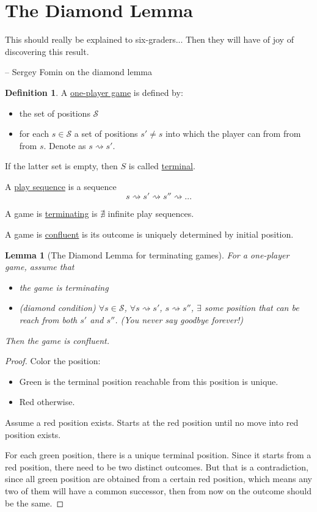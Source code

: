 \documentclass{report}
\newtheorem{lemma}{Lemma}[section]
\theoremstyle{definition}
\newtheorem{definition}{Definition}[section]
\theoremstyle{remark}
\numberwithin{equation}{section}
\begin{document}
\section{The Diamond Lemma}
\epigraph{This should really be explained to six-graders... Then they will have of joy of discovering this result.}{-- \textup{Sergey Fomin on the diamond lemma}}
\begin{definition}
    A \underline{one-player game} is defined by:
    \begin{itemize}
        \item the set of positions $\mathcal{S}$
        \item for each $s \in \mathcal{S}$ a set of positions $s' \neq s$ into which the player can from from from $s$. Denote as $s \rightsquigarrow s'$.
    \end{itemize}
    If the latter set is empty, then $S$ is called \underline{terminal}.

    A \underline{play sequence} is a sequence
    \[s \rightsquigarrow s' \rightsquigarrow s'' \rightsquigarrow \ldots\]

    A game is \underline{terminating} is $\nexists$ infinite play sequences.

    A game is \underline{confluent} is its outcome is uniquely determined by initial position.
\end{definition}

\begin{lemma}[The Diamond Lemma for terminating games]
    For a one-player game, assume that
    \begin{itemize}
        \item the game is terminating
        \item[$\diamond$](diamond condition) $\forall s \in \mathcal{S}$, $\forall s \rightsquigarrow s'$, $s \rightsquigarrow s''$, $\exists$ some position that can be reach from both $s'$ and $s''$. (You never say goodbye forever!)
    \end{itemize}
    Then the game is confluent.
\end{lemma}
\begin{proof}
    Color the position:
    \begin{itemize}
        \item[\textcolor{green}\textbullet] Green is the terminal position reachable from this position is unique.
        \item[\textcolor{red}\textbullet] Red otherwise.
    \end{itemize}
    Assume a red position exists. Starts at the red position until no move into red position exists. 

    For each green position, there is a unique terminal position. Since it starts from a red position, there need to be two distinct outcomes. But that is a contradiction, since all green position are obtained from a certain red position, which means any two of them will have a common successor, then from now on the outcome should be the same.
\end{proof}
\end{document}
